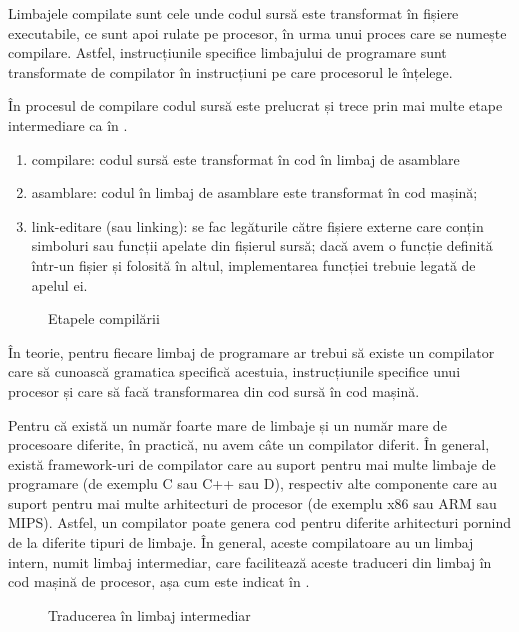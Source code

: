 Limbajele compilate sunt cele unde codul sursă este transformat în fișiere executabile, ce sunt apoi rulate pe procesor, în urma unui proces care se numește compilare.
Astfel, instrucțiunile specifice limbajului de programare sunt transformate de compilator în instrucțiuni pe care procesorul le înțelege.

În procesul de compilare codul sursă este prelucrat și trece prin mai multe etape intermediare ca în .

\begin{enumerate}
  \item compilare: codul sursă este transformat în cod în limbaj de asamblare
  \item asamblare: codul în limbaj de asamblare este transformat în cod mașină;
  \item link-editare (sau linking): se fac legăturile către fișiere externe care conțin simboluri sau funcții apelate din fișierul sursă;
dacă avem o funcție definită într-un fișier și folosită în altul, implementarea funcției trebuie legată de apelul ei.
\end{enumerate}

\begin{figure}[htbp]
  \centering
  \def\svgwidth{0.6\columnwidth}
  
  \caption{Etapele compilării}
  \label{fig:appdev:compile-phases}
\end{figure}

În teorie, pentru fiecare limbaj de programare ar trebui să existe un compilator care să cunoască gramatica specifică acestuia, instrucțiunile specifice unui procesor și care să facă transformarea din cod sursă în cod mașină.

Pentru că există un număr foarte mare de limbaje și un număr mare de procesoare diferite, în practică, nu avem câte un compilator diferit.
În general, există framework-uri de compilator care au suport pentru mai multe limbaje de programare (de exemplu C sau C++ sau D), respectiv alte componente care au suport pentru mai multe arhitecturi de procesor (de exemplu x86 sau ARM sau MIPS).
Astfel, un compilator poate genera cod pentru diferite arhitecturi pornind de la diferite tipuri de limbaje.
În general, aceste compilatoare au un limbaj intern, numit limbaj intermediar, care facilitează aceste traduceri din limbaj în cod mașină de procesor, așa cum este indicat în .

\begin{figure}[htbp]
  \centering
  \def\svgwidth{0.6\columnwidth}
  
  \caption{Traducerea în limbaj intermediar}
  \label{fig:appdev:intermediary}
\end{figure}

